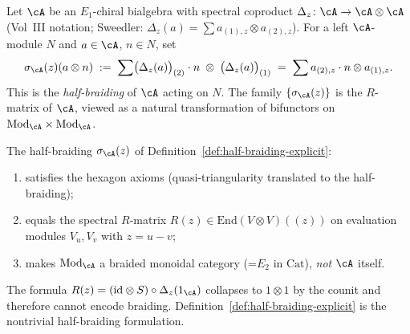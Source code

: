 \begin{definition}%
\label{def:half-braiding-explicit}%
%
%
Let $\cA$ be an $E_1$-chiral bialgebra with spectral coproduct
$\Delta_z\colon\cA\to\cA\otimes\cA$
(Vol~III notation; Sweedler: $\Delta_z(a)=\sum a_{(1),z}\otimes a_{(2),z}$).
For a left $\cA$-module $N$ and $a\in\cA$, $n\in N$, set
\[
\sigma_\cA(z)(a\otimes n)
\;:=\;
\sum\bigl(\Delta_z(a)\bigr)_{(2)}\cdot n\;\otimes\;\bigl(\Delta_z(a)\bigr)_{(1)}
\;=\;\sum a_{(2),z}\cdot n\otimes a_{(1),z}.
\]
This is the \emph{half-braiding} of $\cA$ acting on $N$. The family
$\{\sigma_\cA(z)\}$ is the $R$-matrix of $\cA$, viewed as a natural
transformation of bifunctors on $\mathrm{Mod}_\cA\times\mathrm{Mod}_\cA$.
\end{definition}

\begin{proposition}%
\label{prop:half-braiding-R-matrix}%
%
%
The half-braiding $\sigma_\cA(z)$ of
Definition~\ref{def:half-braiding-explicit}:
\begin{enumerate}
 \item[\textup{(i)}] satisfies the hexagon axioms (quasi-triangularity
 translated to the half-braiding);
 \item[\textup{(ii)}] equals the spectral $R$-matrix
 $R(z)\in\mathrm{End}(V\otimes V)(\!(z)\!)$ on evaluation modules
 $V_u,V_v$ with $z=u-v$;
 \item[\textup{(iii)}] makes $\mathrm{Mod}_\cA$ a braided monoidal
 category (=$E_2$ in $\mathrm{Cat}$), \emph{not} $\cA$ itself.
\end{enumerate}
The formula $R(z)=(\mathrm{id}\otimes S)\circ\Delta_z(1_\cA)$
collapses to $1\otimes 1$ by the counit and therefore cannot encode
braiding. Definition~\ref{def:half-braiding-explicit} is the
nontrivial half-braiding formulation.
\end{proposition}

